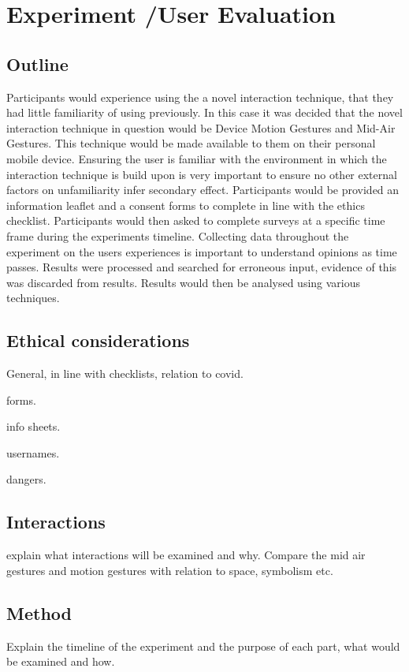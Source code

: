 \documentclass{l4proj}
\begin{document}

\chapter{Experiment /User Evaluation}

\section{Outline}
Participants would experience using the a novel interaction technique, that they had little familiarity of using previously. In this case it was decided that the novel interaction technique in question would be Device Motion Gestures and Mid-Air Gestures. This technique would be made available to them on their personal mobile device. Ensuring the user is familiar with the environment in which the interaction technique is build upon is very important to ensure no other external factors on unfamiliarity infer secondary effect. Participants would be provided an information leaflet and a consent forms to complete in line with the ethics checklist. Participants would then asked to complete surveys at a specific time frame during the experiments timeline. Collecting data throughout the experiment on the users experiences is important to understand opinions as time passes. Results were processed and searched for erroneous input, evidence of this was discarded from results. Results would then be analysed using various techniques.

\section{Ethical considerations}
General, in line with checklists, relation to covid.

forms.

info sheets.

usernames.

dangers.

\section{Interactions}
explain what interactions will be examined and why. Compare the mid air gestures and motion gestures with relation to space, symbolism etc.

\section{Method}
Explain the timeline of the experiment and the purpose of each part, what would be examined and how.
\end{document}
